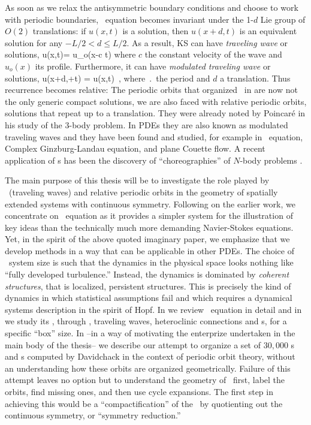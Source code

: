 As soon as we relax the antisymmetric boundary conditions and
choose to work with periodic boundaries, \KS\ equation
becomes invariant under the 1-$d$ Lie group of $O(2)$
translations: if $u(x,t)$ is a solution, then $u(x+d,t)$ is
an equivalent solution for any $-L/2 < d \leq L/2$. As a
result, KS can have \emph{traveling wave} or \emph{\reqv}
solutions,
\beq
 u(x,t)= u_o(x-c t)
\eeq
where $c$ the constant velocity of the wave and $u_o(x)$ its
profile. Furthermore, it can have \emph{modulated traveling
wave} or \emph{\rpo} solutions,
\beq
u(x+d,\period{}+t) = u(x,t)
\,,
where $\period{}$ the period and $d$ a translation.
Thus recurrence becomes
relative: The periodic orbits that organized \statesp\ in
 are now not the
only generic compact solutions, we are also faced with relative
periodic orbits, solutions that repeat up to a
translation.
They were already noted by Poincar\'e in his study of the
3-body problem. In PDEs they are also
known as modulated traveling waves and they have been found and
studied, for example in \KS\ equation, Complex
Ginzburg-Landau equation, and plane Couette
flow. A recent application of \rpo s has
been the discovery of ``choreographies'' of $N$-body problems%
.

The main purpose of this thesis will be to investigate the
role played by \reqva\ (traveling waves) and relative
periodic orbits in the geometry of spatially extended systems
with continuous symmetry. Following on the earlier work, we
concentrate on \KS\ equation as it provides a simpler system
for the illustration of key ideas than the technically much
more demanding Navier-Stokes equations. Yet, in the spirit of the
above quoted imaginary paper, we emphasize that we develop
methods in a way that can be applicable in other PDEs. The
choice of \KS\ system size is such that the dynamics in the
physical space looks nothing like ``fully developed
turbulence.'' Instead, the dynamics is dominated by
\emph{coherent structures}, that is localized,
persistent structures. This is precisely the kind of
dynamics in which statistical assumptions fail and
which requires a dynamical systems description in the spirit of
Hopf.
In  we review \KS\ equation in detail and in
 we study its \statesp, through \eqva,
traveling waves, heteroclinic connections and \rpo s, for a
specific ``box'' size.
In  --in a way of motivating the enterprize
undertaken in the main body of the thesis-- we describe our
attempt to organize a set of $30,000$ {\po s} and {\rpo s}
computed by Davidchack in the
context of periodic orbit theory, without an understanding how
these orbits are organized geometrically. Failure of this
attempt leaves no option but to understand the geometry of
\statesp\ first, label the orbits, find missing ones, and then
use cycle expansions. The first step in  achieving this would
be a ``compactification'' of the \statesp\ by quotienting out
the continuous symmetry, or ``symmetry reduction.''


